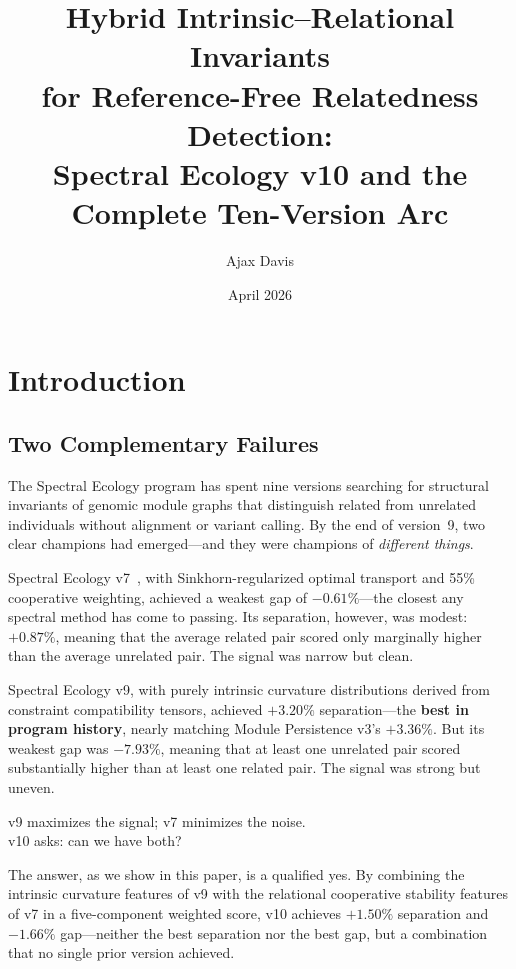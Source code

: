 \documentclass{../yalumba}
\title{Hybrid Intrinsic--Relational Invariants\\for Reference-Free Relatedness Detection:\\Spectral Ecology v10 and the\\Complete Ten-Version Arc}
\author{Ajax Davis}
\date{April 2026}
\begin{document}
\maketitle

\tableofcontents
\newpage


\section{Introduction}
\label{sec:intro}

\subsection{Two Complementary Failures}

The Spectral Ecology program has spent nine versions searching for
structural invariants of genomic module graphs that distinguish related
from unrelated individuals without alignment or variant calling.  By the
end of version~9, two clear champions had emerged---and they were
champions of \emph{different things}.


Spectral Ecology v7~\cite{cuturi2013sinkhorn}, with Sinkhorn-regularized
optimal transport and 55\% cooperative weighting, achieved a weakest gap
of $-0.61\%$---the closest any spectral method has come to passing.  Its
separation, however, was modest: $+0.87\%$, meaning that the average
related pair scored only marginally higher than the average unrelated
pair.  The signal was narrow but clean.

Spectral Ecology v9, with purely intrinsic curvature distributions
derived from constraint compatibility tensors, achieved $+3.20\%$
separation---the \textbf{best in program history}, nearly matching
Module Persistence v3's $+3.36\%$.  But its weakest gap was $-7.93\%$,
meaning that at least one unrelated pair scored substantially higher
than at least one related pair.  The signal was strong but uneven.

\begin{pullquote}
v9 maximizes the signal; v7 minimizes the noise.\\
v10 asks: can we have both?
\end{pullquote}

The answer, as we show in this paper, is a qualified yes.  By combining
the intrinsic curvature features of v9 with the relational cooperative
stability features of v7 in a five-component weighted score, v10
achieves $+1.50\%$ separation and $-1.66\%$ gap---neither the best
separation nor the best gap, but a combination that no single prior
version achieved.
\end{document}
